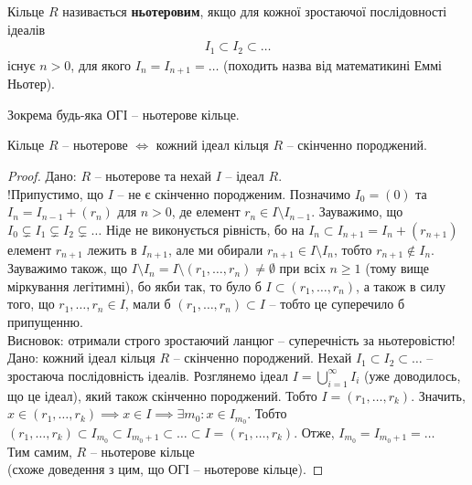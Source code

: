 \documentclass{math_library}
\begin{document}
\begin{definition}
Кільце $R$ називається \textbf{ньотеровим}, якщо для кожної зростаючої послідовності ідеалів
\begin{align*}
I_1 \subset I_2 \subset \dots
\end{align*}
існує $n>0$, для якого $I_n = I_{n+1} = \dots$ (походить назва від математикині Еммі Ньотер).
\end{definition}

\begin{example}
Зокрема будь-яка ОГІ -- ньотерове кільце.
\end{example}

\begin{proposition}
Кільце $R$ -- ньотерове $\iff $ кожний ідеал кільця $R$ -- скінченно породжений.
\end{proposition}

\begin{proof}
\rightproof Дано: $R$ -- ньотерове та нехай $I$ -- ідеал $R$. \\
!Припустимо, що $I$ -- не є скінченно породженим. Позначимо $I_0 = (0)$ та $I_n = I_{n-1} + (r_n)$ для $n > 0$, де елемент $r_n \in I \setminus I_{n-1}$. Зауважимо, що $I_0 \subsetneq I_1 \subsetneq I_2 \subsetneq \dots$ Ніде не виконується рівність, бо на $I_{n} \subset I_{n+1} = I_{n} + (r_{n+1})$ елемент $r_{n+1}$ лежить в $I_{n+1}$, але ми обирали $r_{n+1} \in I \setminus I_n$, тобто $r_{n+1} \notin I_n$. Зауважимо також, що $I \setminus I_n = I \setminus (r_1,\dots,r_n) \neq \emptyset$ при всіх $n \geq 1$ (тому вище міркування легітимні), бо якби так, то було б $I \subset (r_1,\dots,r_n)$, а також в силу того, що $r_1,\dots,r_n \in I$, мали б $(r_1,\dots,r_n) \subset I$ -- тобто це суперечило б припущенню.\\
Висновок: отримали строго зростаючий ланцюг -- суперечність за ньотеровістю!
\bigskip \\
\leftproof Дано: кожний ідеал кільця $R$ -- скінченно породжений. Нехай $I_1 \subset I_2 \subset \dots$ -- зростаюча послідовність ідеалів. Розглянемо ідеал $I = \displaystyle\bigcup_{i=1}^\infty I_i$ (уже доводилось, що це ідеал), який також скінченно породжений. Тобто $I = (r_1,\dots,r_k)$. Значить, $x \in (r_1,\dots,r_k) \implies x \in I \implies \exists m_0: x \in I_{m_0}$. Тобто $(r_1,\dots,r_k) \subset I_{m_0} \subset I_{m_0 + 1} \subset \dots \subset I = (r_1,\dots,r_k)$. Отже, $I_{m_0} = I_{m_0+1} = \dots$ \\
Тим самим, $R$ -- ньотерове кільце \\
(схоже доведення з цим, що ОГІ -- ньотерове кільце).
\end{proof}
\end{document}

